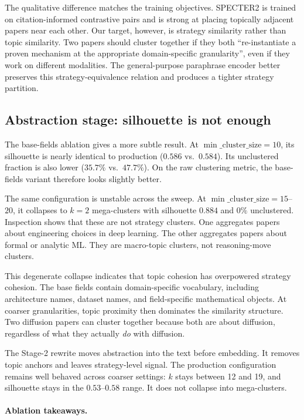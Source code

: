 \documentclass[10pt,a4paper]{article}
\begin{document}
The qualitative difference matches the training objectives. SPECTER2 is trained on citation-informed contrastive pairs and is strong at placing topically adjacent papers near each other. Our target, however, is strategy similarity rather than topic similarity. Two papers should cluster together if they both ``re-instantiate a proven mechanism at the appropriate domain-specific granularity'', even if they work on different modalities. The general-purpose paraphrase encoder better preserves this strategy-equivalence relation and produces a tighter strategy partition.

\subsection{Abstraction stage: silhouette is not enough}

The base-fields ablation gives a more subtle result. At $\min\_\text{cluster\_size}=10$, its silhouette is nearly identical to production ($0.586$ vs.\ $0.584$). Its unclustered fraction is also lower ($35.7\%$ vs.\ $47.7\%$). On the raw clustering metric, the base-fields variant therefore looks slightly better.

The same configuration is unstable across the sweep. At $\min\_\text{cluster\_size}=15$--$20$, it collapses to $k = 2$ mega-clusters with silhouette $0.884$ and $0\%$ unclustered. Inspection shows that these are not strategy clusters. One aggregates papers about engineering choices in deep learning. The other aggregates papers about formal or analytic ML. They are macro-topic clusters, not reasoning-move clusters.

This degenerate collapse indicates that topic cohesion has overpowered strategy cohesion. The base fields contain domain-specific vocabulary, including architecture names, dataset names, and field-specific mathematical objects. At coarser granularities, topic proximity then dominates the similarity structure. Two diffusion papers can cluster together because both are about diffusion, regardless of what they actually \emph{do} with diffusion.

The Stage-2 rewrite moves abstraction into the text before embedding. It removes topic anchors and leaves strategy-level signal. The production configuration remains well behaved across coarser settings: $k$ stays between 12 and 19, and silhouette stays in the $0.53$--$0.58$ range. It does not collapse into mega-clusters.

\paragraph{Ablation takeaways.}
\end{document}
